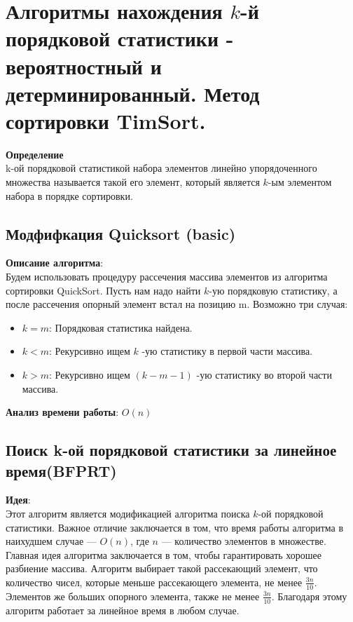 \section {Алгоритмы нахождения $k$-й порядковой статистики - вероятностный и детерминированный.
Метод сортировки TimSort.}

\noindent\textbf{Определение}\\
k-ой порядковой статистикой набора элементов линейно упорядоченного множества называется такой его элемент, который является $k$-ым элементом набора в порядке сортировки.

\subsection{Модфифкация Quicksort (basic)}
\noindent\textbf{Описание алгоритма}:\\
Будем использовать процедуру рассечения массива элементов из алгоритма сортировки QuickSort. Пусть нам надо найти $k$-ую порядковую статистику, а после рассечения опорный элемент встал на позицию m. Возможно три случая:
\begin{itemize}
    \item $k = m$: Порядковая статистика найдена.\\
    \item $k < m$: Рекурсивно ищем $k$ -ую статистику в первой части массива.\\
	\item $k > m$: Рекурсивно ищем $(k - m -1)$ -ую статистику во второй части массива.\\
\end{itemize}
\noindent\textbf{Анализ времени работы}: $O(n)$
\subsection{Поиск k-ой порядковой статистики за линейное время(BFPRT)}

\noindent\textbf{Идея}:\\
Этот алгоритм является модификацией алгоритма поиска $k$-ой порядковой статистики. Важное отличие заключается в том, что время работы алгоритма в наихудшем случае — $O(n)$, где $n$ — количество элементов в множестве. Главная идея алгоритма заключается в том, чтобы гарантировать хорошее разбиение массива. Алгоритм выбирает такой рассекающий элемент, что количество чисел, которые меньше рассекающего элемента, не менее $\frac{3n}{10}$. Элементов же больших опорного элемента, также не менее $\frac{3n}{10}$. Благодаря этому алгоритм работает за линейное время в любом случае. 

